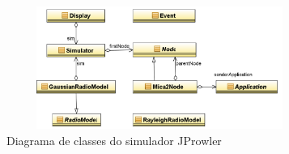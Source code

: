 \begin{figure}[H]
\centering
\includegraphics[height=4cm,width=10cm]{JProwlerClassDiagram.png}
\caption{Diagrama de classes do simulador JProwler}
\label{fig:jprowler_cd}
\end{figure}
